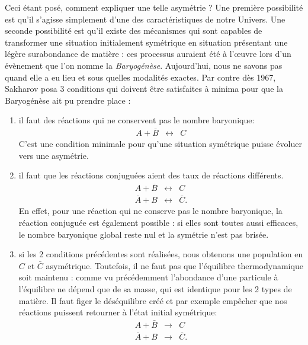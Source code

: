 Ceci étant posé, comment expliquer une telle asymétrie ? Une première possibilité est qu'il s'agisse simplement d'une des caractéristiques de notre Univers. Une seconde possibilité est qu'il existe des mécanismes qui sont capables de transformer une situation initialement symétrique en situation présentant une légère surabondance de matière : ces processus auraient été à l'œuvre lors d'un évènement que l'on nomme la \textit{Baryogénèse}. Aujourd'hui, nous ne savons pas quand elle a eu lieu et sous quelles modalités exactes. Par contre dès 1967, Sakharov posa 3 conditions qui doivent être satisfaites à minima pour que la Baryogénèse ait pu prendre place :
\begin{enumerate}
\item il faut des réactions qui ne conservent pas le nombre baryonique:
\begin{eqnarray}
A + \bar B &\leftrightarrow& C
\end{eqnarray}
C'est une condition minimale pour qu'une situation symétrique puisse évoluer vers une asymétrie.
\item il faut que les réactions conjuguées aient des taux de réactions différents.
\begin{eqnarray}
A + \bar B &\leftrightarrow& C\\
\bar A + B &\leftrightarrow& \bar C.
\end{eqnarray}
En effet, pour une réaction qui ne conserve pas le nombre baryonique, la réaction conjuguée est également possible : si elles sont toutes aussi efficaces, le nombre baryonique global reste nul et la symétrie n'est pas brisée.
\item si les 2 conditions précédentes sont réalisées, nous obtenons une population en $C$ et $\bar C$ asymétrique. Toutefois, il ne faut pas que l'équilibre thermodynamique soit maintenu : comme vu précédemment l'abondance d'une particule à l'équilibre ne dépend que de sa masse, qui est identique pour les 2 types de matière. Il faut figer le déséquilibre créé et par exemple empêcher que nos réactions puissent retourner à l'état initial symétrique:
\begin{eqnarray}
A + \bar B &\rightarrow& C\\
\bar A + B &\rightarrow& \bar C.
\end{eqnarray}
\end{enumerate}
